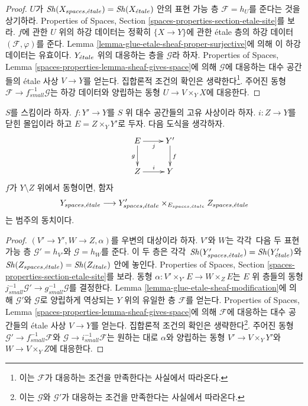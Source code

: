 \begin{proof}
$U$가 $\mathop{\mathit{Sh}}\nolimits(X_{spaces, {\acute{e}tale}}) = \mathop{\mathit{Sh}}\nolimits(X_{\acute{e}tale})$ 안의
표현 가능 층 $\mathcal{F} = h_U$를 준다는 것을 상기하라.
Properties of Spaces, Section \ref{spaces-properties-section-etale-site}를 보라.
$f$에 관한 $U$ 위의 하강 데이터는 정확히 $\{X \to Y\}$에 관한
\'etale 층의 하강 데이터 $(\mathcal{F}, \varphi)$를 준다.
Lemma \ref{lemma-glue-etale-sheaf-proper-surjective}에 의해
이 하강 데이터는 유효이다. $Y_{\acute{e}tale}$ 위의 대응하는 층을
$\mathcal{G}$라 하자. Properties of Spaces, Lemma
\ref{spaces-properties-lemma-sheaf-gives-space}에 의해
$\mathcal{G}$에 대응하는 대수 공간들의 \'etale 사상 $V \to Y$를 얻는다.
집합론적 조건의 확인은 생략한다\footnote{이는 $\mathcal{F}$가
대응하는 조건을 만족한다는 사실에서 따라온다.}.
주어진 동형 $\mathcal{F} \to f_{small}^{-1}\mathcal{G}$는
하강 데이터와 양립하는 동형 $U \to V \times_Y X$에 대응한다.
\end{proof}

\begin{lemma}
\label{lemma-glue-etale-space-modification}
$S$를 스킴이라 하자. $f : Y' \to Y$를
$S$ 위 대수 공간들의 고유 사상이라 하자.
$i : Z \to Y$를 닫힌 몰입이라 하고 $E = Z \times_Y Y'$로 두자.
다음 도식을 생각하자.
$$
\xymatrix{
E \ar[d]_g \ar[r]_j & Y' \ar[d]^f \\
Z \ar[r]^i & Y
}
$$
$f$가 $Y \setminus Z$ 위에서 동형이면, 함자
$$
Y_{spaces, {\acute{e}tale}}
\longrightarrow
Y'_{spaces, {\acute{e}tale}} \times_{E_{spaces, {\acute{e}tale}}} Z_{spaces, {\acute{e}tale}}
$$
는 범주의 동치이다.
\end{lemma}

\begin{proof}
$(V' \to Y', W \to Z, \alpha)$를 우변의 대상이라 하자.
$V'$와 $W$는 각각\ 다음 두 표현 가능 층
$\mathcal{G}' = h_{V'}$와 $\mathcal{G} = h_W$를 준다.
이 두 층은 각각\ $\mathop{\mathit{Sh}}\nolimits(Y'_{spaces, {\acute{e}tale}}) = \mathop{\mathit{Sh}}\nolimits(Y'_{\acute{e}tale})$와
$\mathop{\mathit{Sh}}\nolimits(Z_{spaces, {\acute{e}tale}}) = \mathop{\mathit{Sh}}\nolimits(Z_{\acute{e}tale})$ 안에 놓인다.
Properties of Spaces, Section \ref{spaces-properties-section-etale-site}를 보라.
동형 $\alpha : V' \times_{Y'} E \to W \times_Z E$는
$E$ 위 층들의 동형
$j_{small}^{-1}\mathcal{G}' \to g_{small}^{-1}\mathcal{G}$를 결정한다.
Lemma \ref{lemma-glue-etale-sheaf-modification}에 의해
$\mathcal{G}'$와 $\mathcal{G}$로 양립하게 역상되는 $Y$ 위의
유일한 층 $\mathcal{F}$를 얻는다. Properties of Spaces, Lemma
\ref{spaces-properties-lemma-sheaf-gives-space}에 의해
$\mathcal{F}$에 대응하는 대수 공간들의 \'etale 사상 $V \to Y$를 얻는다.
집합론적 조건의 확인은 생략한다\footnote{%
이는 $\mathcal{G}$와 $\mathcal{G}'$가 대응하는 조건을
만족한다는 사실에서 따라온다.}.
주어진 동형 $\mathcal{G}' \to f_{small}^{-1}\mathcal{F}$와
$\mathcal{G} \to i_{small}^{-1}\mathcal{F}$는 원하는 대로
$\alpha$와 양립하는 동형 $V' \to V \times_Y Y'$와
$W \to V \times_Y Z$에 대응한다.
\end{proof}

